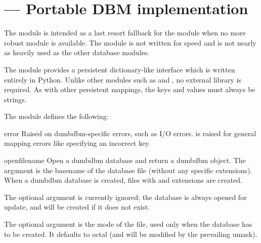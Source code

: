 \section{ ---
         Portable DBM implementation}



\begin{notice}
The  module is intended as a last resort fallback for
the  module when no more robust module is available.
The  module is not written for speed and is not nearly as
heavily used as the other database modules.
\end{notice}

The  module provides a persistent dictionary-like interface
which is written entirely in Python.  Unlike other modules such as
 and , no external library is required.  As
with other persistent mappings, the keys and values must always be strings.

The module defines the following:

\begin{excdesc}{error}
Raised on dumbdbm-specific errors, such as I/O errors.  
is raised for general mapping errors like specifying an incorrect key.
\end{excdesc}

\begin{funcdesc}{open}{filename}
Open a dumbdbm database and return a dumbdbm object.  The 
argument is the basename of the database file (without any specific
extensions).  When a dumbdbm database is created, files with  and
 extensions are created.

The optional  argument is currently ignored; the database is
always opened for update, and will be created if it does not exist.

The optional  argument is the \UNIX{} mode of the file, used
only when the database has to be created.  It defaults to octal
 (and will be modified by the prevailing umask).
\end{funcdesc}


\begin{seealso}
\end{seealso}


